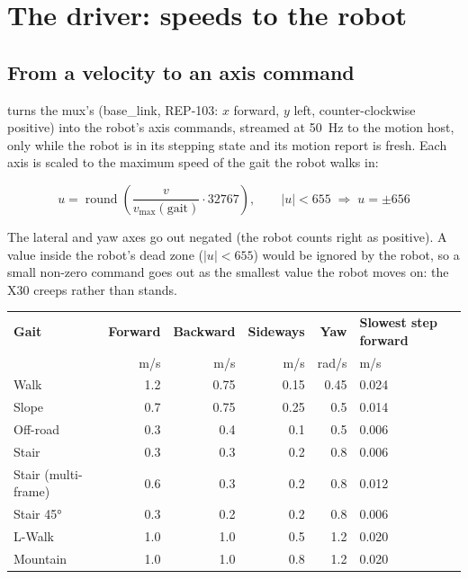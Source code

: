 \chapter{The driver: speeds to the robot}
\label{ch:t-driver}

\section{From a velocity to an axis command}

 turns the mux's  (base\_link, REP-103: $x$ forward, $y$ left,
counter-clockwise positive) into the robot's axis commands, streamed at \SI{50}{Hz} to the motion
host, only while the robot is in its stepping state and its motion report is fresh. Each axis is
scaled to the maximum speed of the gait the robot walks in:

\begin{equation}
  u = \operatorname{round}\!\left(\frac{v}{v_{\max}(\text{gait})}\cdot 32767\right),
  \qquad |u| < 655 \;\Rightarrow\; u = \pm 656
\end{equation}

The lateral and yaw axes go out negated (the robot counts right as positive). A value inside the
robot's dead zone ($|u| < 655$) would be ignored by the robot, so a small non-zero command goes
out as the smallest value the robot moves on: the X30 creeps rather than stands.

\begin{center}
\begin{small}
\begin{tabularx}{\linewidth}{@{}lrrrrX@{}}
  \toprule
  \textbf{Gait} & \textbf{Forward} & \textbf{Backward} & \textbf{Sideways} & \textbf{Yaw} &
    \textbf{Slowest step forward} \\
   & m/s & m/s & m/s & rad/s & m/s \\
  \midrule
  Walk & 1.2 & 0.75 & 0.15 & 0.45 & 0.024 \\
  Slope & 0.7 & 0.75 & 0.25 & 0.5 & 0.014 \\
  Off-road & 0.3 & 0.4 & 0.1 & 0.5 & 0.006 \\
  Stair & 0.3 & 0.3 & 0.2 & 0.8 & 0.006 \\
  Stair (multi-frame) & 0.6 & 0.3 & 0.2 & 0.8 & 0.012 \\
  Stair \ang{45} & 0.3 & 0.2 & 0.2 & 0.8 & 0.006 \\
  L-Walk & 1.0 & 1.0 & 0.5 & 1.2 & 0.020 \\
  Mountain & 1.0 & 1.0 & 0.8 & 1.2 & 0.020 \\
  \bottomrule
\end{tabularx}
\end{small}
\end{center}

